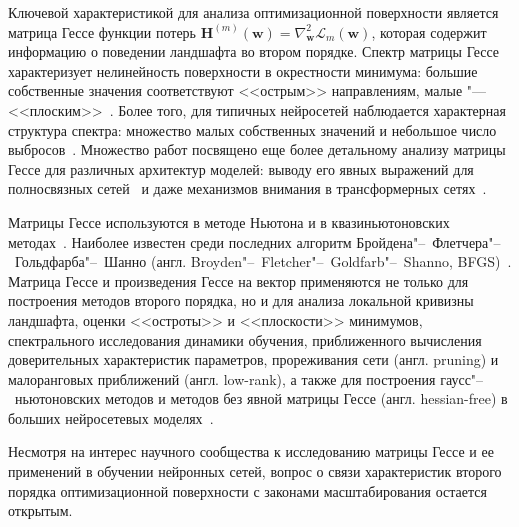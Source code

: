 Ключевой характеристикой для анализа оптимизационной поверхности является матрица Гессе функции потерь $\mathbf{H}^{(m)}(\mathbf{w}) = \nabla^2_{\mathbf{w}} \mathcal{L}_{m}(\mathbf{w})$, которая содержит информацию о поведении ландшафта во втором порядке. Спектр матрицы Гессе характеризует нелинейность поверхности в окрестности минимума: большие собственные значения соответствуют  <<острым>> направлениям, малые "--- <<плоским>>~\cite{hochreiter1997flat,dauphin2014,keskar2017largebatch,li2018visualizing}. Более того, для типичных нейросетей наблюдается характерная структура спектра: множество малых собственных значений и небольшое число выбросов~\cite{papyan2019,ghorbani2019investigation,sankar2021deeper,singh2021analytic}. Множество работ посвящено еще более детальному анализу матрицы Гессе для различных архитектур моделей: выводу его явных выражений для полносвязных сетей~\cite{bishop1992hessian,pearlmutter1994,martens2012curvprop} и даже механизмов внимания в трансформерных сетях~\cite{ormaniec2024transformerhessian}.

Матрицы Гессе используются в методе Ньютона и в квазиньютоновских методах~\cite{nocedal2006numerical,dennis1983}. Наиболее известен среди последних алгоритм Бройдена"--~Флетчера"--~Гольдфарба"--~Шанно (англ. Broyden"--~Fletcher"--~Goldfarb"--~Shanno, BFGS)~\cite{broyden1970,fletcher1970}. Матрица Гессе и произведения Гессе на вектор применяются не только для построения методов второго порядка, но и для анализа локальной кривизны ландшафта, оценки <<остроты>> и <<плоскости>> минимумов, спектрального исследования динамики обучения, приближенного вычисления доверительных характеристик параметров, прореживания сети (англ. pruning) и малоранговых приближений (англ. low-rank), а также для построения гаусс"--~ньютоновских методов и методов без явной матрицы Гессе (англ. hessian-free) в больших нейросетевых моделях~\cite{martens2010hf,martens2012curvprop,papyan2019,zhang2024whytransformers}.

Несмотря на интерес научного сообщества к исследованию матрицы Гессе и ее применений в обучении нейронных сетей, вопрос о связи характеристик второго порядка оптимизационной поверхности с законами масштабирования остается открытым.

